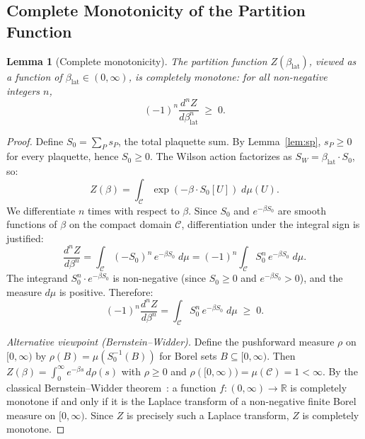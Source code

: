 \documentclass[12pt,a4paper]{article}
\theoremstyle{plain}
\newtheorem{lemma}[theorem]{Lemma}
\theoremstyle{definition}
\theoremstyle{remark}
\begin{document}
\subsection{Complete Monotonicity of the Partition Function}\label{sec:cm}

\begin{lemma}[Complete monotonicity]\label{lem:cm}
The partition function $Z(\beta_{\mathrm{lat}})$, viewed as a function of $\beta_{\mathrm{lat}}\in(0,\infty)$, is completely monotone: for all non-negative integers $n$,
\begin{equation}\label{eq:cm}
(-1)^n\frac{d^n Z}{d\beta_{\mathrm{lat}}^n} \;\geq\; 0.
\end{equation}
\end{lemma}

\begin{proof}
Define $S_0 = \sum_{P} s_P$, the total plaquette sum. By Lemma~\ref{lem:sp}, $s_P\geq 0$ for every plaquette, hence $S_0\geq 0$. The Wilson action factorizes as $S_W=\beta_{\mathrm{lat}}\cdot S_0$, so:
\begin{equation}\label{eq:Zlaplace}
Z(\beta) = \int_{\mathcal{C}} \exp(-\beta\cdot S_0[U])\;d\mu(U).
\end{equation}
We differentiate $n$ times with respect to $\beta$. Since $S_0$ and $e^{-\beta S_0}$ are smooth functions of $\beta$ on the compact domain $\mathcal{C}$, differentiation under the integral sign is justified:
\begin{equation}\label{eq:cmderiv}
\frac{d^n Z}{d\beta^n} = \int_{\mathcal{C}} (-S_0)^n\,e^{-\beta S_0}\;d\mu = (-1)^n\int_{\mathcal{C}} S_0^n\,e^{-\beta S_0}\;d\mu.
\end{equation}
The integrand $S_0^n\cdot e^{-\beta S_0}$ is non-negative (since $S_0\geq 0$ and $e^{-\beta S_0}>0$), and the measure $d\mu$ is positive. Therefore:
\begin{equation}
(-1)^n\frac{d^n Z}{d\beta^n} = \int_{\mathcal{C}} S_0^n\,e^{-\beta S_0}\;d\mu \;\geq\; 0.
\end{equation}

\textit{Alternative viewpoint (Bernstein--Widder).} Define the pushforward measure $\rho$ on $[0,\infty)$ by $\rho(B)=\mu(S_0^{-1}(B))$ for Borel sets $B\subseteq[0,\infty)$. Then $Z(\beta)=\int_0^\infty e^{-\beta s}\,d\rho(s)$ with $\rho\geq 0$ and $\rho([0,\infty))=\mu(\mathcal{C})=1<\infty$. By the classical Bernstein--Widder theorem~\cite{Bernstein1929,Widder1941}: a function $f:(0,\infty)\to\mathbb{R}$ is completely monotone if and only if it is the Laplace transform of a non-negative finite Borel measure on $[0,\infty)$. Since $Z$ is precisely such a Laplace transform, $Z$ is completely monotone.
\end{proof}
\end{document}
